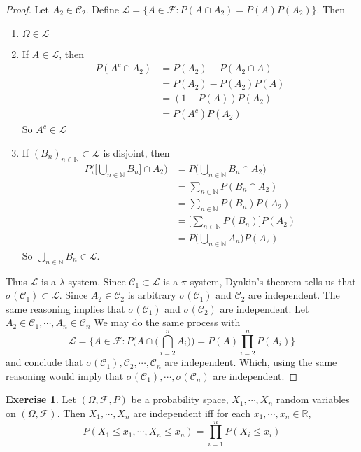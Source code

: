 \documentclass[12pt]{amsart}
\theoremstyle{definition}
\newtheorem{ex}[definition]{Exercise}
\newcommand{\lam}{\lambda}
\newcommand{\sig}{\sigma}
\newcommand{\Om}{\Omega}
\newcommand{\N}{\mathbb{N}}
\newcommand{\R}{\mathbb{R}}
\newcommand{\MC}{\mathcal{C}}
\newcommand{\MF}{\mathcal{F}}
\newcommand{\ML}{\mathcal{L}}
\begin{document}
	\begin{proof}
		Let $A_2 \in \MC_2$. Define $\ML = \{A \in \MF: P(A\cap A_2) = P(A)P(A_2)\}$. Then 
		\begin{enumerate}
			\item $\Om \in \ML$
			\item If $A \in \ML$, then 
			\begin{align*}
				P(A^c \cap A_2) 
				&= P(A_2) - P(A_2 \cap A) \\
				&= P(A_2) - P(A_2) P(A) \\
				&= (1- P(A))P(A_2) \\
				&= P(A^c)P(A_2)
			\end{align*}
			So $A^c \in \ML$
			\item If $(B_n)_{n \in \N} \subset \ML$ is disjoint, then 
			\begin{align*}
				P\bigg( \bigg[\bigcup_{n \in \N}B_n \bigg] \cap A_2\bigg) 
				&= P \bigg( \bigcup_{n \in \N}B_n \cap A_2 \bigg) \\
				&= \sum_{n \in \N}P(B_n \cap A_2) \\
				&= \sum_{n \in \N}P(B_n) P(A_2) \\
				&=   \bigg[\sum_{n \in \N}P(B_n)\bigg]P(A_2)  \\
				&=  P\bigg( \bigcup_{n \in \N} A_n\bigg) P(A_2) 
			\end{align*} 
			So $\bigcup\limits_{n \in \N}B_n \in \ML$. 
		\end{enumerate}
		Thus $\ML$ is a $\lam$-system. Since $\MC_1 \subset \ML$ is a $\pi$-system, Dynkin's theorem tells us that $\sig(\MC_1) \subset \ML$. Since $A_2 \in \MC_2$ is arbitrary $\sig(\MC_1)$ and $\MC_2$ are independent. The same reasoning implies that $\sig(\MC_1)$ and $\sig(\MC_2)$ are independent. Let $A_2 \in \MC_1, \cdots, A_n \in \MC_n$ We may do the same process with $$\ML = \bigg \{A \in \MF: P\bigg(A \cap \bigg(\bigcap_{i=2}^n A_i\bigg) \bigg) = P(A)\prod_{i=2}^n P(A_i)\bigg\}$$ and conclude that $\sig(\MC_1), \MC_2, \cdots, \MC_n$ are independent. Which, using the same reasoning would imply that $\sig(\MC_1), \cdots, \sig(\MC_n)$ are independent.
	\end{proof}
	
	\begin{ex}
		Let $(\Om, \MF, P)$ be a probability space, $X_1, \cdots, X_n$ random variables on $(\Om, \MF)$. Then $X_1, \cdots, X_n$ are independent iff for each $x_1, \cdots, x_n \in \R$, $$P(X_1 \leq x_1, \cdots, X_n \leq x_n ) = \prod_{i=1}^nP(X_i \leq x_i)$$
	\end{ex}
	
\end{document}
